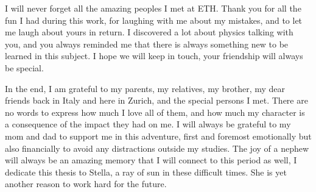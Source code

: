 I will never forget all the amazing peoples I met at ETH. Thank you for all the fun I had during this work, for laughing with me about my mistakes, and to let me laugh about yours in return. I discovered a lot about physics talking with you, and you always reminded me that there is always something new to be learned in this subject. I hope we will keep in touch, your friendship will always be special.

In the end, I am grateful to my parents, my relatives, my brother, my dear friends back in Italy and here in Zurich, and the special persons I met. There are no words to express how much I love all of them, and how much my character is a consequence of the impact they had on me. I will always be grateful to my mom and dad to support me in this adventure, first and foremost emotionally but also financially to avoid any distractions outside my studies. The joy of a nephew will always be an amazing memory that I will connect to this period as well, I dedicate this thesis to Stella, a ray of sun in these difficult times. She is yet another reason to work hard for the future.